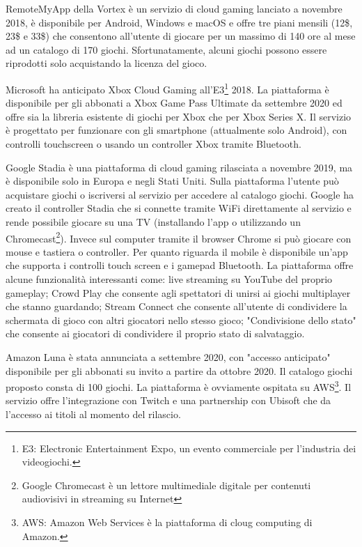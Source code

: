 RemoteMyApp della Vortex è un servizio di cloud gaming lanciato a novembre 2018, è disponibile per Android, Windows e macOS e offre tre piani mensili (12\$, 23\$ e 33\$) che consentono all'utente di giocare per un massimo di 140 ore al mese ad un catalogo di 170 giochi. Sfortunatamente, alcuni giochi possono essere riprodotti solo acquistando la licenza del gioco\cite{RemoteMyApp_Vortex}.

Microsoft ha anticipato Xbox Cloud Gaming all'E3\footnote{E3: Electronic Entertainment Expo, un evento commerciale per l'industria dei videogiochi.} 2018. La piattaforma è disponibile per gli abbonati a Xbox Game Pass Ultimate da settembre 2020 ed offre sia la libreria esistente di giochi per Xbox che per Xbox Series X. Il servizio è progettato per funzionare con gli smartphone (attualmente solo Android), con controlli touchscreen o usando un controller Xbox tramite Bluetooth\cite{Xbox_Game_Pass_cloud_gaming}.

Google Stadia è una piattaforma di cloud gaming rilasciata a novembre 2019, ma è disponibile solo in Europa e negli Stati Uniti. Sulla piattaforma l'utente può acquistare giochi o iscriversi al servizio per accedere al catalogo giochi. Google ha creato il controller Stadia che si connette tramite WiFi direttamente al servizio e rende possibile giocare su una TV (installando l'app o utilizzando un Chromecast\footnote{Google Chromecast è un lettore multimediale digitale per contenuti audiovisivi in streaming su Internet}). Invece sul computer tramite il browser Chrome si può giocare con mouse e tastiera o controller. Per quanto riguarda il mobile è disponibile un'app che supporta i controlli touch screen e i gamepad Bluetooth. La piattaforma offre alcune funzionalità interessanti come: live streaming su YouTube del proprio gameplay; Crowd Play che consente agli spettatori di unirsi ai giochi multiplayer che stanno guardando; Stream Connect che consente all'utente di condividere la schermata di gioco con altri giocatori nello stesso gioco; "Condivisione dello stato" che consente ai giocatori di condividere il proprio stato di salvataggio\cite{Google_Stadia}.

Amazon Luna è stata annunciata a settembre 2020, con "accesso anticipato" disponibile per gli abbonati su invito a partire da ottobre 2020. Il catalogo giochi proposto consta di 100 giochi. La piattaforma è ovviamente ospitata su AWS\footnote{AWS: Amazon Web Services è la piattaforma di cloug computing di Amazon.}. Il servizio offre l'integrazione con Twitch e una partnership con Ubisoft che da l'accesso ai titoli al momento del rilascio\cite{Amazon_Luna}.

